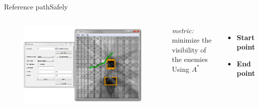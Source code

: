 \begin{frame}{Reference path}{Safely}

\begin{columns}
\begin{figure}
\centering
\includegraphics[width = \textwidth]{./screenshot/safely_reference_path.png}
\end{figure}

\begin{minipage}{\textwidth}
\emph{metric:} minimize the visibility of the enemies
\bigskip
Using $ A^{*} $
\begin{itemize}
\item \textbf{Start point}
\item \textbf{End point}
\end{itemize}
\end{minipage}
\end{columns}

\end{frame}

